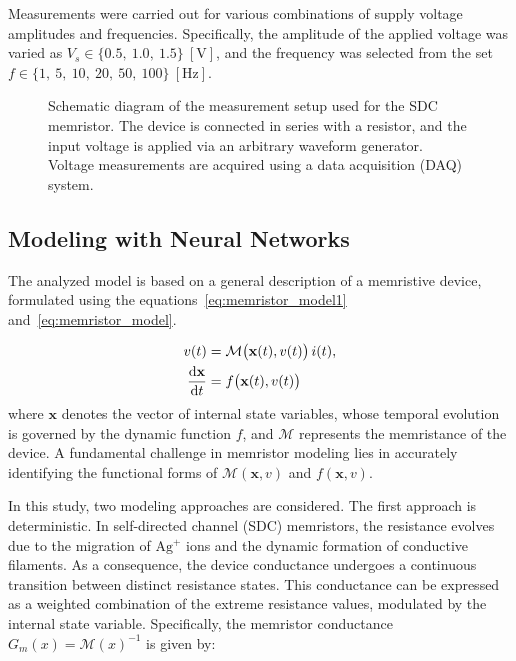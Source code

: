 \documentclass[11pt, oneside]{article}
\newcommand{\der}{{\rm d}}
\newcommand{\M}{\mathcal{M}}
\newcommand{\ua}{v}
\newcommand{\ia}{i}
\begin{document}
Measurements were carried out for various combinations of supply voltage amplitudes and frequencies. Specifically, the amplitude of the applied voltage was varied as $V_s \in \{0.5,\ 1.0,\ 1.5\}~\mathrm{[V]}$, and the frequency was selected from the set $f \in \{1,\ 5,\ 10,\ 20,\ 50,\ 100\}~\mathrm{[Hz]}$.


\begin{figure}[H]
    \centering
    \resizebox{0.5\linewidth}{!}{%
        }
    \vspace{-0.5in}
    \caption{Schematic diagram of the measurement setup used for the SDC memristor. The device is connected in series with a resistor, and the input voltage is applied via an arbitrary waveform generator. Voltage measurements are acquired using a data acquisition (DAQ) system.}
    \label{fig:memristor_setup}
\end{figure}

\subsection{Modeling with Neural Networks}
The analyzed model is based on a general description of a memristive device, formulated using the equations~\eqref{eq:memristor_model1} and~\eqref{eq:memristor_model}.


\newcommand{\xvec}{\mathbf{x}}
\begin{align}
    \label{eq:memristor_model1}
    \ua(t)                    & = \M \big(\xvec(t),\ua(t)\big) \, \ia(t), \\
    \label{eq:memristor_model}
    \frac{\der \xvec}{\der t} & = f\big(\xvec(t),\ua(t)\big)
\end{align}
where $\xvec$ denotes the vector of internal state variables, whose temporal evolution is governed by the dynamic function $f$, and $\M$ represents the memristance of the device. A fundamental challenge in memristor modeling lies in accurately identifying the functional forms of $\M(\xvec,\ua)$ and $f(\xvec,\ua)$.

In this study, two modeling approaches are considered.
The first approach is deterministic. In self-directed channel (SDC) memristors, the resistance evolves due to the migration of $\mathrm{Ag^+}$ ions and the dynamic formation of conductive filaments. As a consequence, the device conductance undergoes a continuous transition between distinct resistance states. This conductance can be expressed as a weighted combination of the extreme resistance values, modulated by the internal state variable. Specifically, the memristor conductance $G_m(x) = \M(x)^{-1}$ is given by:
\end{document}
